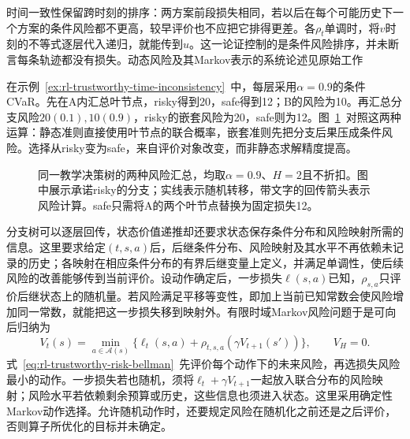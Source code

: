 时间一致性保留跨时刻的排序：两方案前段损失相同，若以后在每个可能历史下一个方案的条件风险都不更高，较早评价也不应把它排得更差。各$\rho_t$单调时，将$v$时刻的不等式逐层代入递归，就能传到$u$。这一论证控制的是条件风险排序，并未断言每条轨迹都没有损失。动态风险及其Markov表示的系统论述见原始工作

在示例~\ref{ex:rl-trustworthy-time-inconsistency}~中，每层采用$\alpha=0.9$的条件CVaR。先在A内汇总叶节点，risky得到20，safe得到12；B的风险为10。再汇总分支风险$20(0.1),10(0.9)$，risky的嵌套风险为20，safe则为12。图~\ref{fig:rl-trustworthy-risk-tree}~对照这两种运算：静态准则直接使用叶节点的联合概率，嵌套准则先把分支后果压成条件风险。选择从risky变为safe，来自评价对象改变，而非静态求解精度提高。

\begin{figure}[t]
  \centering
  
  \caption{同一教学决策树的两种风险汇总，均取$\alpha=0.9$、$H=2$且不折扣。图中展示承诺risky的分支；实线表示随机转移，带文字的回传箭头表示风险计算。safe只需将A的两个叶节点替换为固定损失12。}
  \label{fig:rl-trustworthy-risk-tree}
\end{figure}

分支树可以逐层回传，状态价值递推却还要求状态保存条件分布和风险映射所需的信息。这里要求给定$(t,s,a)$后，后继条件分布、风险映射及其水平不再依赖未记录的历史；各映射在相应条件分布的有界后继变量上定义，并满足单调性，使后续风险的改善能够传到当前评价。设动作确定后，一步损失$\ell(s,a)$已知，$\rho_{s,a}$只评价后继状态上的随机量。若风险满足平移等变性，即加上当前已知常数会使风险增加同一常数，就能把这一步损失移到映射外。有限时域Markov风险问题于是可向后归纳为
\begin{equation}
  V_t(s)=\min_{a\in\mathcal A(s)}
    \{\ell_t(s,a)+\rho_{t,s,a}(\gamma V_{t+1}(s'))\},
  \qquad V_H=0.
  \label{eq:rl-trustworthy-risk-bellman}
\end{equation}
式~\eqref{eq:rl-trustworthy-risk-bellman}~先评价每个动作下的未来风险，再选损失风险最小的动作。一步损失若也随机，须将$\ell_t+\gamma V_{t+1}$一起放入联合分布的风险映射；风险水平若依赖剩余预算或历史，这些信息也须进入状态。这里采用确定性Markov动作选择。允许随机动作时，还要规定风险在随机化之前还是之后评价，否则算子所优化的目标并未确定。


